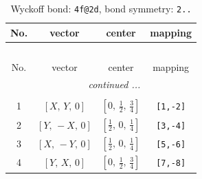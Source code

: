 \documentclass[fleqn,8pt]{jsarticle}
\begin{document}
\renewcommand{\arraystretch}{1.2}
\begin{longtable}{cccc}
\caption{Wyckoff bond: {\tt 4f@2d}, bond symmetry: {\tt 2..}}
 \\
 \hline \hline
No. & vector & center & mapping \\ \hline \endfirsthead

\multicolumn{3}{l}{\tablename\ \thetable{}} \\
 \hline \hline
No. & vector & center & mapping \\ \hline \endhead

 \hline \hline
\multicolumn{3}{r}{\footnotesize\it continued ...} \\ \endfoot

 \hline \hline
\multicolumn{3}{r}{} \\ \endlastfoot

1 & $\left[ X,\, Y,\, 0 \right]$ & $\left[ 0,\, \frac{1}{2},\, \frac{3}{4} \right]$ & {\tt [1,-2]} \\ \hline
2 & $\left[ Y,\, - X,\, 0 \right]$ & $\left[ \frac{1}{2},\, 0,\, \frac{1}{4} \right]$ & {\tt [3,-4]} \\ \hline
3 & $\left[ X,\, - Y,\, 0 \right]$ & $\left[ \frac{1}{2},\, 0,\, \frac{1}{4} \right]$ & {\tt [5,-6]} \\ \hline
4 & $\left[ Y,\, X,\, 0 \right]$ & $\left[ 0,\, \frac{1}{2},\, \frac{3}{4} \right]$ & {\tt [7,-8]} \\
\end{longtable}
\renewcommand{\arraystretch}{1.2}
\end{document}
